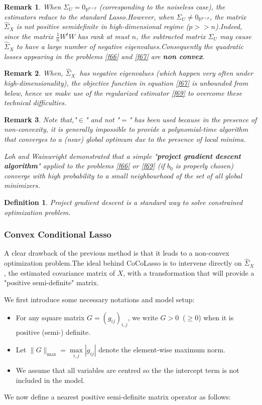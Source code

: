 \documentclass[12pt]{report}
\newtheorem {definition}{Definition}[section] %
\newtheorem{remarque}{Remark}[section]
\begin{document}
\begin{remarque}
	When $\Sigma_{U}=0_{\mathbb{R}^{p\times p}}$ (corresponding to the noiseless case), the estimators reduce to the standard Lasso.However, when $\Sigma_{U} \neq0_{\mathbb{R}^{p\times p}}$, the matrix $\hat{\Sigma}_{X}$ is not positive semidefinite in high-dimensional regime ($p>>n$).Indeed, since the matrix $\frac{1}{n}W^{t}W$ has rank at must $n$, the subtracted matrix $\Sigma_{U}$ may cause $\hat{\Sigma}_{X}$ to have a large number of negative eigenvalues.Consequently the quadratic losses appearing in the problems \eqref{f66} and \eqref{f67} are \textbf{non convex}.
\end{remarque}
\begin{remarque}
	When, $\hat{\Sigma}_{X}\ $  has negative eigenvalues (which happen very often under high-dimensionality), the objective function in equation \eqref{f67} is unbounded from below, hence we make use of the regularized estimator \eqref{f69} to overcome these technical  difficulties.
\end{remarque}

\begin{remarque}
	Note that,"$\in$" and not "$=$" has been used because in the presence of non-convexity, it is generally impossible to provide a polynomial-time algorithm that converges to a (near) global optimum due to the presence of local minima.
	
	\textit{Loh and Wainwright \cite{nref13}} demonstrated that a simple "\textbf{project gradient descent algorithm}" applied to the problems \eqref{f66} or \eqref{f69} (if $b_{0}$ is properly chosen) converge with high probability to a small neighbourhood of the set of all global minimizers.
\end{remarque}
\begin{definition}
	Project gradient descent is a standard way to solve constrained optimization problem.
\end{definition}
\subsubsection{Convex Conditional Lasso}
A clear drawback of the previous method is that it leads to a non-convex optimization problem.The ideal behind CoCoLasso is to intervene directly on $\hat{\Sigma}_{X}\ $, the estimated covariance matrix of $X$, with a transformation that will provide a "positive semi-definite" matrix.

We first introduce some necessary notations and model setup:
\begin{itemize}
	\item For any square matrix $G=(g_{ij})_{i,j}$, we write $G>0\ $ ($\geq$0) when it is positive (semi-) definite.
	\item Let $\parallel G\parallel_{\max}=\underset{i,j}{\max}|g_{ij}|$ denote the element-wise maximum norm.
	\item We assume that all variables are centred so the the intercept term is not included in the model.
\end{itemize}
We now define a nearest positive semi-definite matrix operator as follows:
\end{document}
